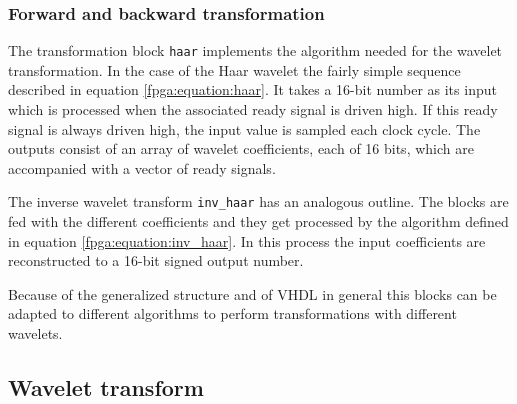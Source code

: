 \begin{refsection}
\subsubsection{Forward and backward transformation}

The transformation block \texttt{haar} implements the algorithm needed for the wavelet transformation.
In the case of the Haar wavelet the fairly simple sequence described in equation \ref{fpga:equation:haar}.
It takes a 16-bit number as its input which is processed when the associated ready signal is driven high.
If this ready signal is always driven high, the input value is sampled each clock cycle.
The outputs consist of an array of wavelet coefficients, each of 16 bits, which are accompanied with a vector of ready signals. 

The inverse wavelet transform \texttt{inv\_haar} has an analogous outline.
The blocks are fed with the different coefficients and they get processed by the algorithm defined in equation \ref{fpga:equation:inv_haar}.
In this process the input coefficients are reconstructed to a 16-bit signed output number.%

Because of the generalized structure and of VHDL in general this blocks can be adapted to different algorithms to perform transformations with different wavelets.




\subsection{Wavelet transform}


\end{refsection}
